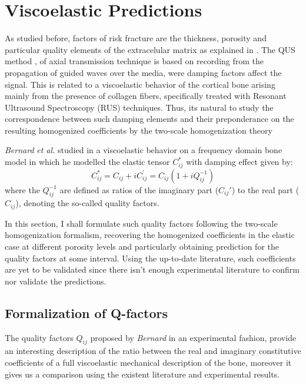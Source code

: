 \chapter{Viscoelastic Predictions}
As studied before, factors of risk fracture are the thickness, porosity and particular quality elements of the extracelular matrix as explained in \cite{Bernard2015}. The QUS method \cite{Foiret2014}, \cite{Minonzio2018} of axial transmission technique is based on recording from the propagation of guided waves over the media, were damping factors affect the signal. This is related to a viscoelastic behavior of the cortical bone arising mainly from the presence of collagen fibers, specifically treated with Resonant Ultrasound Spectroscopy (RUS) techniques. Thus, its natural to study the correspondence between such damping elements and their preponderance on the resulting homogenized coefficients by the two-scale homogenization theory

\textit{Bernard} \textit{et al. }\cite{Bernard2015} studied in a viscoelastic behavior on a frequency domain bone model in which he modelled the elastic tensor $C^*_{ij}$ with damping effect given by:
\begin{equation*}
C^*_{ij} = C_{ij} + i C_{ij}^{'} = C_{ij} (1+ iQ_{ij}^{-1})
\end{equation*}
where the $Q^{-1}_{ij}$ are defined as ratios of the imaginary part ($C_{ij}'$) to the real part ($C_{ij}$), denoting the so-called quality factors.

In this section, I shall formulate such quality factors following the two-scale homogenization formalism, recovering the homogenized coefficients in the elastic case at different porosity levels and particularly obtaining prediction for the quality factors at some interval. Using the up-to-date literature, such coefficients are yet to be validated since there isn't enough experimental literature to confirm nor validate the predictions.

\section{Formalization of Q-factors}
The quality factors $Q_{ij}$ proposed by \textit{Bernard} in an experimental fashion, provide an interesting description of the ratio between the real and imaginary constitutive coefficients of a full viscoelastic mechanical description of the bone, moreover it gives us a comparison using the existent literature and experimental results.

